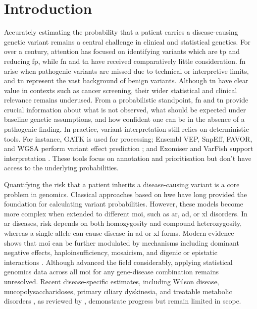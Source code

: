 \section{Introduction}
Accurately estimating the probability that a patient carries a disease-causing genetic variant remains a central challenge in clinical and statistical genetics. For over a century, attention has focused on identifying variants which are \ac{tp} and reducing \ac{fp}, while \ac{fn} and \ac{tn} have received comparatively little consideration. \ac{fn} arise when pathogenic variants are missed due to technical or interpretive limits, and \ac{tn} represent the vast background of benign variants. Although \ac{tn} have clear value in contexts such as cancer screening, their wider statistical and clinical relevance remains underused. From a probabilistic standpoint, \ac{fn} and \ac{tn} provide crucial information about what is not observed, what should be expected under baseline genetic assumptions, and how confident one can be in the absence of a pathogenic finding. In practice, variant interpretation still relies on deterministic tools. For instance, GATK is used for processing; Ensembl VEP, SnpEff, FAVOR, and WGSA perform variant effect prediction \cite{2024riccioVariantEffectPredictors}; and Exomiser and VarFish support interpretation \cite{2020ciprianiImprovedPhenotypeDrivenTool, 2020holtgreweVarFishComprehensiveDNA}. These tools focus on annotation and prioritisation but don't have access to the underlying probabilities.

Quantifying the risk that a patient inherits a disease-causing variant is a core problem in genomics. Classical approaches based on \ac{hwe} \cite{MayoCentury2008, AbramovsHardyWeinberg2020} have long provided the foundation for calculating variant probabilities. However, these models become more complex when extended to different \ac{moi}, such as \ac{ar}, \ac{ad}, or \ac{xl} disorders. In \ac{ar} diseases, risk depends on both homozygosity and compound heterozygosity, whereas a single allele can cause disease in \ac{ad} or \ac{xl} forms. Modern evidence shows that \ac{moi} can be further modulated by mechanisms including dominant negative effects, haploinsufficiency, mosaicism, and digenic or epistatic interactions \cite{zschocke_mendelian_2023}. Although \citet{karczewski2020mutational} advanced the field considerably, applying statistical genomics data across all \ac{moi} for any gene-disease combination remains unresolved. Recent disease-specific estimates, including Wilson disease, mucopolysaccharidoses, primary ciliary dyskinesia, and treatable metabolic disorders \cite{bick_estimating_2025, evans_estimating_2021}, as reviewed by \citet{hannah_using_2024}, demonstrate progress but remain limited in scope.

